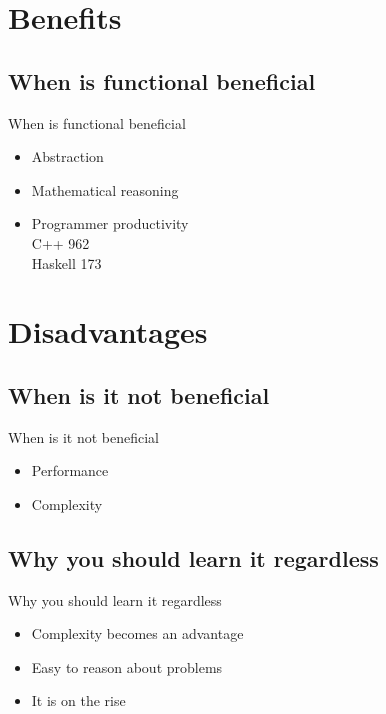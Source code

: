 \documentclass[10pt, compress, xcolor=table]{beamer}
\begin{document}
\section{Benefits}
\subsection{When is functional beneficial}
\begin{frame}{When is functional beneficial}
    \begin{itemize}
        \item{
            Abstraction
        }
        \item {
            Mathematical reasoning
        }
        \item{
            Programmer productivity\\
            C++ 962\\
            Haskell 173
        }
    \end{itemize}
\end{frame}
\section{Disadvantages}
\subsection{When is it not beneficial}
\begin{frame}{When is it not beneficial}
    \begin{itemize}
        \item {
            Performance
        }
        \item {
            Complexity
        }
    \end{itemize}
    \pause
    \begin{example}
        \makehaskellcomplex
    \end{example}
\end{frame}
\subsection{Why you should learn it regardless}
\begin{frame}{Why you should learn it regardless}
    \begin{itemize}
        \item{
            Complexity becomes an advantage
        }
        \item {
            Easy to reason about problems
        }
        \item {
            It is on the rise
        }
    \end{itemize}
\end{frame}
\end{document}
